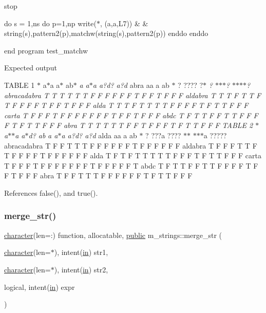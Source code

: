 stop

do s = 1,ns do p=1,np write($\ast$, \textquotesingle{}(a,a,L7)\textquotesingle{}) \& \& string(s),pattern2(p),matchw(string(s),pattern2(p)) enddo enddo

end program test\+\_\+matchw

Expected output

T\+A\+B\+LE 1 $\ast$ a$\ast$a a$\ast$ ab$\ast$ {\itshape a a$\ast$a a?d? a?d} abra aa a ab $\ast$ ? ???? ?$\ast$ {\itshape ? $\ast$$\ast$$\ast$? $\ast$$\ast$$\ast$$\ast$? abracadabra T T T T T T F F F F F F T F F T F F F aldabra T T T F T T F T F F F F T F F T F F F alda T T T F T T T T F F F F T F T T F F F carta T F F F T F F F F F F F T F F T F F F abdc T F T T F F T T F F F F T F T T F F F abra T T T T T T F F T F F F T F T T F F F T\+A\+B\+LE 2 $\ast$ a$\ast$$\ast$a a$\ast$d? ab} {\itshape a a$\ast$a a?d? a?d} alda aa a ab $\ast$ ? ???a ???? $\ast$$\ast$ $\ast$$\ast$$\ast$a ????? abracadabra T F F T T T F F F F F F T F F F F F F aldabra T F F F T T F T F F F F T F F F F F F alda T F T F T T T T T F F F T F T T F F F carta T F F F T F F F F F F F T F F F F F T abdc T F T T F F T T F F F F T F F T F F F abra T F F T T T F F F F F F T F T T F F F 

References false(), and true().

\mbox{\label{namespacem__strings_aba5a8d7fc092b38d1939f37a13247c1e}} 
\subsubsection{\texorpdfstring{merge\+\_\+str()}{merge\_str()}}
{\footnotesize\ttfamily \hyperlink{option__stopwatch_83_8txt_abd4b21fbbd175834027b5224bfe97e66}{character}(len=\+:) function, allocatable, \hyperlink{M__stopwatch_83_8txt_a2f74811300c361e53b430611a7d1769f}{public} m\+\_\+strings\+::merge\+\_\+str (\begin{DoxyParamCaption}\item[{\hyperlink{option__stopwatch_83_8txt_abd4b21fbbd175834027b5224bfe97e66}{character}(len=$\ast$), intent(\hyperlink{M__journal_83_8txt_afce72651d1eed785a2132bee863b2f38}{in})}]{str1,  }\item[{\hyperlink{option__stopwatch_83_8txt_abd4b21fbbd175834027b5224bfe97e66}{character}(len=$\ast$), intent(\hyperlink{M__journal_83_8txt_afce72651d1eed785a2132bee863b2f38}{in})}]{str2,  }\item[{logical, intent(\hyperlink{M__journal_83_8txt_afce72651d1eed785a2132bee863b2f38}{in})}]{expr }\end{DoxyParamCaption})}



